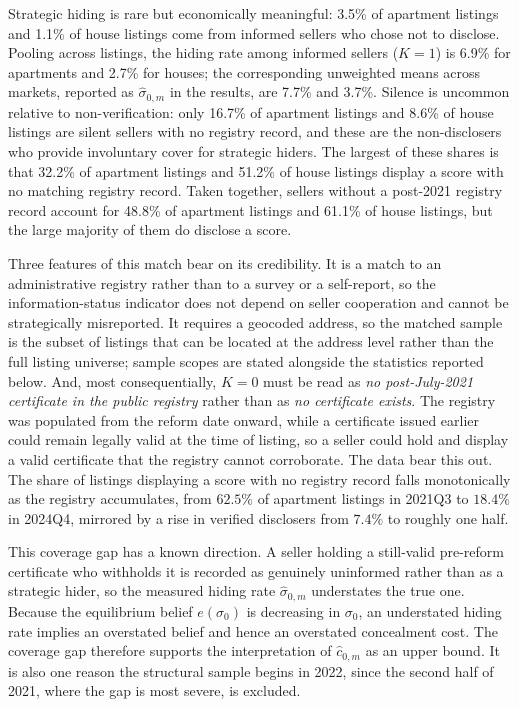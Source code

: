\noindent Strategic hiding is rare but economically meaningful: 3.5\% of apartment listings and 1.1\% of house listings come from informed sellers who chose not to disclose. Pooling across listings, the hiding rate among informed sellers ($K=1$) is 6.9\% for apartments and 2.7\% for houses; the corresponding unweighted means across markets, reported as $\hat\sigma_{0,m}$ in the results, are 7.7\% and 3.7\%. Silence is uncommon relative to non-verification: only 16.7\% of apartment listings and 8.6\% of house listings are silent sellers with no registry record, and these are the non-disclosers who provide involuntary cover for strategic hiders. The largest of these shares is that 32.2\% of apartment listings and 51.2\% of house listings display a score with no matching registry record. Taken together, sellers without a post-2021 registry record account for 48.8\% of apartment listings and 61.1\% of house listings, but the large majority of them do disclose a score.

Three features of this match bear on its credibility. It is a match to an administrative registry
rather than to a survey or a self-report, so the information-status indicator does not depend on
seller cooperation and cannot be strategically misreported. It requires a geocoded address, so the
matched sample is the subset of listings that can be located at the address level rather than the
full listing universe; sample scopes are stated alongside the statistics reported below. And, most
consequentially, $K=0$ must be read as \emph{no post-July-2021 certificate in the public registry}
rather than as \emph{no certificate exists}. The registry was populated from the reform date
onward, while a certificate issued earlier could remain legally valid at the time of listing, so a
seller could hold and display a valid certificate that the registry cannot corroborate. The data
bear this out. The share of listings displaying a score with no registry record falls monotonically
as the registry accumulates, from $62.5\%$ of apartment listings in 2021Q3 to $18.4\%$ in 2024Q4,
mirrored by a rise in verified disclosers from $7.4\%$ to roughly one half.

This coverage gap has a known direction. A seller holding a still-valid pre-reform certificate who
withholds it is recorded as genuinely uninformed rather than as a strategic hider, so the measured
hiding rate $\hat\sigma_{0,m}$ understates the true one. Because the equilibrium belief
$e(\sigma_0)$ is decreasing in $\sigma_0$, an understated hiding rate implies an overstated belief
and hence an overstated concealment cost. The coverage gap therefore supports the
interpretation of $\hat c_{0,m}$ as an upper bound. It is also one reason the
structural sample begins in 2022, since the second half of 2021, where the gap is most severe, is
excluded.

